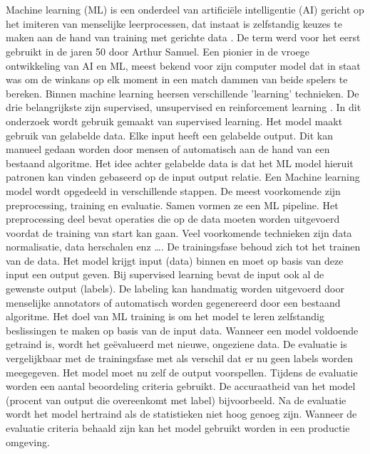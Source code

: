 \section{}%
\label{sec:machine-learning}

Machine learning (ML) is een onderdeel van artificiële intelligentie (AI) gericht op het imiteren van menselijke leerprocessen, dat instaat 
is zelfstandig keuzes te maken aan de hand van training met gerichte data \autocite{ibm2025}. De term werd voor het eerst gebruikt in de 
jaren 50 door Arthur Samuel. Een pionier in de vroege ontwikkeling van AI en ML, meest bekend voor zijn computer model dat in staat 
was om de winkans op elk moment in een match dammen van beide spelers te bereken. 
\newline
\newline
Binnen machine learning heersen verschillende 'learning' technieken. De drie belangrijkste 
zijn supervised, unsupervised en reinforcement learning \autocite{Geron2022}. In dit onderzoek wordt gebruik gemaakt van supervised learning. Het model maakt 
gebruik van gelabelde data. Elke input heeft een gelabelde output. Dit kan manueel gedaan worden door mensen of automatisch aan de 
hand van een bestaand algoritme. Het idee achter gelabelde data is dat het ML model hieruit patronen kan vinden gebaseerd op de input output
relatie. 
\newline
\newline
Een Machine learning model wordt opgedeeld in verschillende stappen. De meest voorkomende zijn preprocessing, training en evaluatie.
Samen vormen ze een ML pipeline. Het preprocessing deel bevat operaties die op de data moeten worden uitgevoerd voordat de training van 
start kan gaan. Veel voorkomende technieken zijn data normalisatie, data herschalen enz \ldots. De trainingsfase behoud zich tot het
trainen van de data. Het model krijgt input (data) binnen en moet op basis van deze input een output geven. Bij supervised learning bevat
de input ook al de gewenste output (labels). De labeling kan handmatig worden uitgevoerd door menselijke annotators of 
automatisch worden gegenereerd door een bestaand algoritme.
\newline
\newline
Het doel van ML training is om het model te leren zelfstandig beslissingen te maken op basis van de input data. 
Wanneer een model voldoende getraind is, wordt het geëvalueerd met nieuwe, ongeziene data. De evaluatie is
vergelijkbaar met de trainingsfase met als verschil dat er nu geen labels worden meegegeven. Het model moet nu zelf de output voorspellen.
Tijdens de evaluatie worden een aantal beoordeling criteria gebruikt. De accuraatheid van het model (procent van output die overeenkomt met
label) bijvoorbeeld. Na de evaluatie wordt het model hertraind als de statistieken niet hoog genoeg zijn. Wanneer de evaluatie criteria behaald 
zijn kan het model gebruikt worden in een productie omgeving.
\newline
\newline


